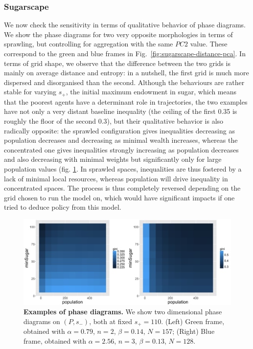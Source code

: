 \documentclass{JASSS}
\begin{document}
\subsubsection{Sugarscape}

We now check the sensitivity in terms of qualitative behavior of phase diagrams. We show the phase diagrams for two very opposite morphologies in terms of sprawling, but controlling for aggregation with the same $PC2$ value. These correspond to the green and blue frames in Fig.~\ref{fig:sugarscape-distance-pca}. In terms of grid shape, we observe that the difference between the two grids is mainly on average distance and entropy: in a nutshell, the first grid is much more dispersed and disorganised than the second. Although the behaviours are rather stable for varying $s_+$, the initial maximum endowment in sugar, which means that the poorest agents have a determinant role in trajectories, the two examples have not only a very distant baseline inequality (the ceiling of the first 0.35 is roughly the floor of the second 0.3), but their qualitative behavior is also radically opposite: the sprawled configuration gives inequalities decreasing as population decreases and decreasing as minimal wealth increases, whereas the concentrated one gives inequalities strongly increasing as population decreases and also decreasing with minimal weights but significantly only for large population values (fig. \ref{fig:sugarscape-phasediagrams}. In sprawled spaces, inequalities are thus fostered by a lack of minimal local resources, whereas population will drive inequality in concentrated spaces. The process is thus completely reversed depending on the grid chosen to run the model on, which would have significant impacts if one tried to deduce policy from this model.


\begin{figure}[!t]
\centering
	\includegraphics[width=\textwidth]{figures/Fig6.png}
\caption{\textbf{Examples of phase diagrams.} We show two dimensional phase diagrams on $(P,s_-)$, both at fixed $s_+ = 110$. (Left) Green frame, obtained with $\alpha = 0.79$, $n=2$, $\beta = 0.14$, $N=157$; (Right) Blue frame, obtained with $\alpha = 2.56$, $n=3$, $\beta = 0.13$, $N=128$.}
\label{fig:sugarscape-phasediagrams}
\end{figure}
\end{document}
